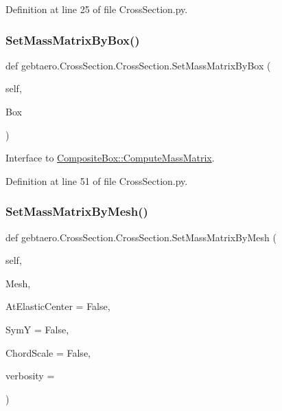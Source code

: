 Definition at line 25 of file Cross\+Section.\+py.

\mbox{\label{classgebtaero_1_1_cross_section_1_1_cross_section_a4914caf35d9b8cfadafe8e359a590d7c}} 
\subsubsection{\texorpdfstring{Set\+Mass\+Matrix\+By\+Box()}{SetMassMatrixByBox()}}
{\footnotesize\ttfamily def gebtaero.\+Cross\+Section.\+Cross\+Section.\+Set\+Mass\+Matrix\+By\+Box (\begin{DoxyParamCaption}\item[{}]{self,  }\item[{}]{Box }\end{DoxyParamCaption})}



Interface to \hyperlink{classgebtaero_1_1_composite_box_1_1_composite_box_a6b944eeef7002377d7b83c5dd6ae6550}{Composite\+Box\+::\+Compute\+Mass\+Matrix}. 



Definition at line 51 of file Cross\+Section.\+py.

\mbox{\label{classgebtaero_1_1_cross_section_1_1_cross_section_a51f5f560da9f747310ebc55db72fd353}} 
\subsubsection{\texorpdfstring{Set\+Mass\+Matrix\+By\+Mesh()}{SetMassMatrixByMesh()}}
{\footnotesize\ttfamily def gebtaero.\+Cross\+Section.\+Cross\+Section.\+Set\+Mass\+Matrix\+By\+Mesh (\begin{DoxyParamCaption}\item[{}]{self,  }\item[{}]{Mesh,  }\item[{}]{At\+Elastic\+Center = {\ttfamily False},  }\item[{}]{SymY = {\ttfamily False},  }\item[{}]{Chord\+Scale = {\ttfamily False},  }\item[{}]{verbosity = {} }\end{DoxyParamCaption})}



